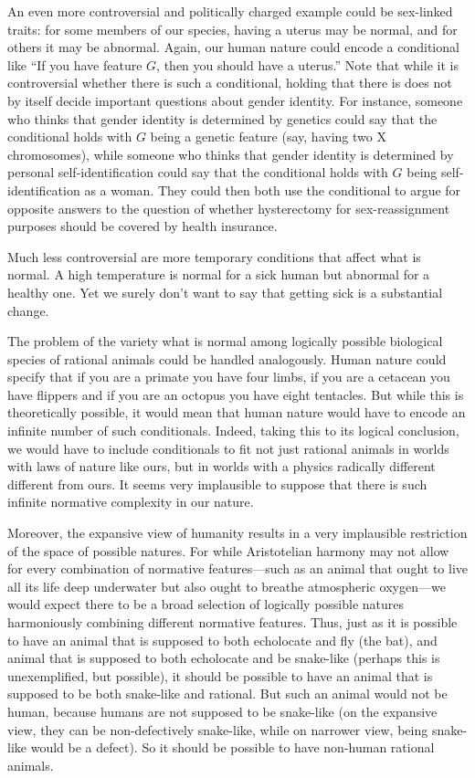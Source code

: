 An even more controversial and politically charged example could be sex-linked traits: for some members of our species, having a uterus may be normal, and for others
it may be abnormal. Again, our human nature could encode a conditional like ``If you have feature $G$, then you should have a uterus.''
Note that while it is controversial whether there is such a conditional, holding that there is does not by itself decide important questions about gender identity.
For instance, someone who thinks that gender identity is determined by genetics could say that the conditional holds with $G$ being a genetic
feature (say, having two X chromosomes), while someone who thinks that gender identity is determined by personal self-identification could say
that the conditional holds with $G$ being self-identification as a woman. They could then both use the conditional to argue for opposite answers
to the question of whether hysterectomy for sex-reassignment purposes should be covered by health insurance. 

Much less controversial are more temporary conditions that affect what is normal. A high temperature is normal for a sick human but abnormal for a
healthy one. Yet we surely don't want to say that getting sick is a substantial change. 

The problem of the variety what is normal among logically possible biological species of rational animals could be handled analogously. 
Human nature could specify that if you are a primate you have four limbs, if you are a cetacean you have flippers and if you are an octopus you have
eight tentacles. But while this is theoretically possible, it would mean that human nature would have to encode an infinite number of such conditionals.
Indeed, taking this to its logical conclusion, we would have to include conditionals to fit not just rational animals in worlds with laws of nature like ours,
but in worlds with a physics radically different different from ours. It seems very implausible to suppose that there is such infinite normative complexity
in our nature.

Moreover, the expansive view of humanity results in a very implausible restriction of the space of possible natures. For while Aristotelian harmony may not
allow for every combination of normative features---such as an animal that ought to live all its life deep underwater but also ought to breathe atmospheric 
oxygen---we would expect there to be a broad selection of logically possible natures harmoniously combining different normative features. Thus, just as it
is possible to have an animal that is supposed to both echolocate and fly (the bat), and animal that is supposed to both echolocate and be snake-like (perhaps
this is unexemplified, but possible), it should
be possible to have an animal that is supposed to be both snake-like and rational. But such an animal would not be human, because humans are not supposed
to be snake-like (on the expansive view, they can be non-defectively snake-like, while on narrower view, being snake-like would be a defect). So it should
be possible to have non-human rational animals.

